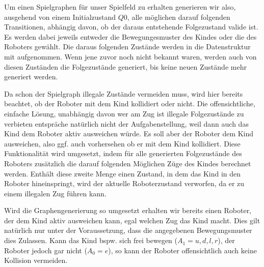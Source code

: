 Um einen Spielgraphen für unser Spielfeld zu erhalten generieren wir also, ausgehend von einem Initialzustand $Q0$, alle möglichen darauf folgenden Transitionen, abhängig davon, ob der daraus entstehende Folgezustand valide ist. Es werden dabei jeweils entweder die Bewegungesmuster des Kindes oder die des Roboters gewählt. Die daraus folgenden Zustände werden in die Datenstruktur mit aufgenommen. Wenn jene zuvor noch nicht bekannt waren, werden auch von diesen Zuständen die Folgezustände generiert, bis keine neuen Zustände mehr generiert werden. 

Da schon der Spielgraph illegale Zustände vermeiden muss, wird hier bereits beachtet, ob der Roboter mit dem Kind kollidiert oder nicht. Die offensichtliche, einfache Lösung, unabhängig davon wer am Zug ist illegale Folgezustände zu verbieten entspräche natürlich nicht der Aufgabenstellung, weil dann auch das Kind dem Roboter aktiv ausweichen würde. Es soll aber der Roboter dem Kind ausweichen, also ggf. auch vorhersehen ob er mit dem Kind kollidiert. Diese Funktionalität wird umgesetzt, indem für alle generierten Folgezustände des Roboters zusätzlich die darauf folgenden Möglichen Züge des Kindes berechnet werden. Enthält diese zweite Menge einen Zustand, in dem das Kind in den Roboter hineinspringt, wird der aktuelle Roboterzustand verworfen, da er zu einem illegalen Zug führen kann.

Wird die Graphengenerierung so umgesetzt erhalten wir bereits einen Roboter, der dem Kind aktiv ausweichen kann, egal welchen Zug das Kind macht. Dies gilt natürlich nur unter der Voraussetzung, dass die angegebenen Bewegungsmuster dies Zulassen. Kann das Kind bspw. sich frei bewegen ($A_1 = {u,d,l,r}$), der Roboter jedoch gar nicht ($A_0 = {e}$), so kann der Roboter offensichtlich auch keine Kollision vermeiden.


